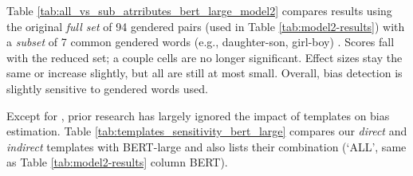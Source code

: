 
\noindent Table \ref{tab:all_vs_sub_atrributes_bert_large_model2} compares results using the original \textit{full set} of 94 gendered pairs (used in Table \ref{tab:model2-results}) with a \textit{subset} of 7 common gendered words (e.g., daughter-son, girl-boy)
\cite{limisiewicz-marecek-2022-dont,steed2022upstream,kurita-etal-2019-measuring}.
% 
Scores fall with the reduced set; a couple cells are no longer significant. Effect sizes stay the same or increase slightly, but all are still at most small. Overall, bias detection is slightly sensitive to gendered words used. 



\noindent 
Except for  \citet{liu2021mitigating}, prior research has largely ignored the impact of templates on bias estimation.
% 
Table \ref{tab:templates_sensitivity_bert_large} compares our \textit{direct} and \textit{indirect} templates with BERT-large and also lists their combination  (`ALL', same as Table \ref{tab:model2-results} column BERT).



